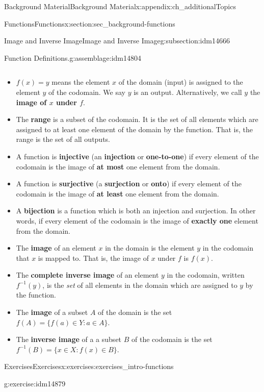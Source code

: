 \documentclass[oneside,10pt,]{book}
\newcommand{\terminology}[1]{\textbf{#1}}
\numberwithin{equation}{chapter}
\def\inv{^{-1}}
\def\st{:}
\begin{document}
\begin{appendixptx}{Background Material}{}{Background Material}{}{}{x:appendix:ch_additionalTopics}
\begin{sectionptx}{Functions}{}{Functions}{}{}{x:section:sec_background-functions}
\begin{subsectionptx}{Image and Inverse Image}{}{Image and Inverse Image}{}{}{g:subsection:idm14666}
\begin{assemblage}{Function Definitions.}{g:assemblage:idm14804}
\begin{itemize}[label=\textbullet]
\begin{equation*}
\end{equation*}
%
\item{}\(f(x) = y\) means the element \(x\) of the domain (input) is assigned to the element \(y\) of the codomain. We say \(y\) is an output. Alternatively, we call \(y\) the \terminology{image of \(x\) under \(f\)}.%
\item{}The \terminology{range} is a subset of the codomain. It is the set of all elements which are assigned to at least one element of the domain by the function. That is, the range is the set of all outputs.%
\item{}A function is \terminology{injective} (an \terminology{injection} or \terminology{one-to-one}) if every element of the codomain is the image of \terminology{at most} one element from the domain.%
\item{}A function is \terminology{surjective} (a \terminology{surjection} or \terminology{onto}) if every element of the codomain is the image of \terminology{at least} one element from the domain.%
\item{}A \terminology{bijection} is a function which is both an injection and surjection. In other words, if every element of the codomain is the image of \terminology{exactly one} element from the domain.%
\item{}The \terminology{image} of an element \(x\) in the domain is the element \(y\) in the codomain that \(x\) is mapped to.  That is, the image of \(x\) under \(f\) is  \(f(x)\).%
\item{}The \terminology{complete inverse image} of an element \(y\) in the codomain, written \(f\inv(y)\), is the \emph{set} of all elements in the domain which are assigned to \(y\) by the function.%
\item{}The \terminology{image} of a subset \(A\) of the domain is the set \(f(A) = \{f(a) \in Y \st a \in A\}\).%
\item{}The \terminology{inverse image} of a a subset \(B\) of the codomain is the set \(f\inv(B) = \{x \in X \st f(x) \in B\}\).%
\end{itemize}
%
\end{assemblage}
\end{subsectionptx}
%
%
\typeout{************************************************}
\typeout{************************************************}
%
\begin{exercises-subsection}{Exercises}{}{Exercises}{}{}{x:exercises:exercises_intro-functions}
\begin{divisionexercise}{1}{}{}{g:exercise:idm14879}%

\end{divisionexercise}
\end{exercises-subsection}
\end{sectionptx}
\end{appendixptx}
\end{document}
